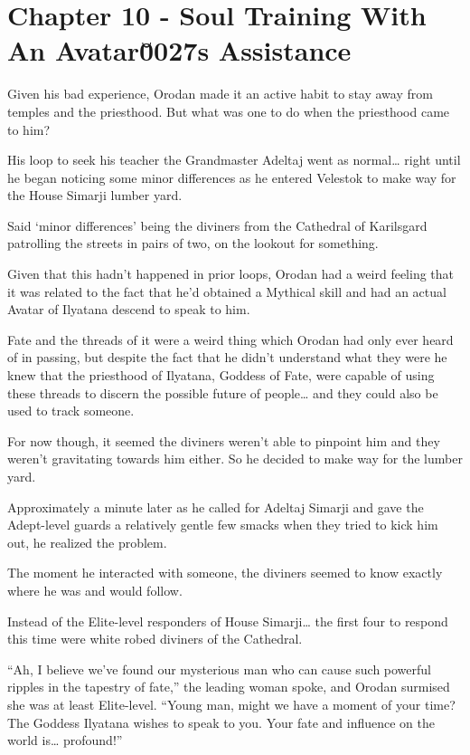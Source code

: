 \documentclass[a4paper,10pt]{book}
\begin{document}
\section*{Chapter 10 - Soul Training With An Avatar\u0027s Assistance}
%
\par
Given his bad experience, Orodan made it an active habit to stay away from temples and the priesthood. But what was one to do when the priesthood came to him?\par
His loop to seek his teacher the Grandmaster Adeltaj went as normal… right until he began noticing some minor differences as he entered Velestok to make way for the House Simarji lumber yard.\par
Said ‘minor differences’ being the diviners from the Cathedral of Karilsgard patrolling the streets in pairs of two, on the lookout for something.\par
Given that this hadn’t happened in prior loops, Orodan had a weird feeling that it was related to the fact that he’d obtained a Mythical skill and had an actual Avatar of Ilyatana descend to speak to him.\par
Fate and the threads of it were a weird thing which Orodan had only ever heard of in passing, but despite the fact that he didn’t understand what they were he knew that the priesthood of Ilyatana, Goddess of Fate, were capable of using these threads to discern the possible future of people… and they could also be used to track someone.\par
For now though, it seemed the diviners weren’t able to pinpoint him and they weren’t gravitating towards him either. So he decided to make way for the lumber yard.\par
Approximately a minute later as he called for Adeltaj Simarji and gave the Adept-level guards a relatively gentle few smacks when they tried to kick him out, he realized the problem.\par
The moment he interacted with someone, the diviners seemed to know exactly where he was and would follow.\par
Instead of the Elite-level responders of House Simarji… the first four to respond this time were white robed diviners of the Cathedral.\par
“Ah, I believe we’ve found our mysterious man who can cause such powerful ripples in the tapestry of fate,” the leading woman spoke, and Orodan surmised she was at least Elite-level. “Young man, might we have a moment of your time? The Goddess Ilyatana wishes to speak to you. Your fate and influence on the world is… profound!”\par
\end{document}
